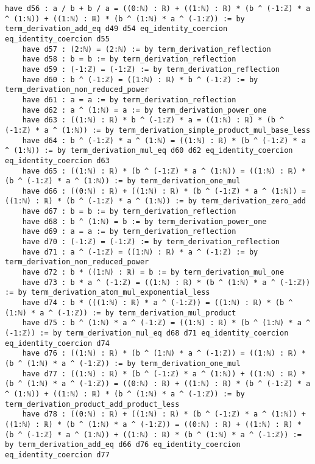 \documentclass{article}
\begin{document}
\begin{tcolorbox}[colback=white!10, width=\linewidth]
\begin{lstlisting}[language=Lean4]
    have d56 : a / b + b / a = ((0:ℕ) : ℝ) + ((1:ℕ) : ℝ) * (b ^ (-1:ℤ) * a ^ (1:ℕ)) + ((1:ℕ) : ℝ) * (b ^ (1:ℕ) * a ^ (-1:ℤ)) := by term_derivation_add_eq d49 d54 eq_identity_coercion eq_identity_coercion d55
    have d57 : (2:ℕ) = (2:ℕ) := by term_derivation_reflection
    have d58 : b = b := by term_derivation_reflection
    have d59 : (-1:ℤ) = (-1:ℤ) := by term_derivation_reflection
    have d60 : b ^ (-1:ℤ) = ((1:ℕ) : ℝ) * b ^ (-1:ℤ) := by term_derivation_non_reduced_power
    have d61 : a = a := by term_derivation_reflection
    have d62 : a ^ (1:ℕ) = a := by term_derivation_power_one
    have d63 : ((1:ℕ) : ℝ) * b ^ (-1:ℤ) * a = ((1:ℕ) : ℝ) * (b ^ (-1:ℤ) * a ^ (1:ℕ)) := by term_derivation_simple_product_mul_base_less
    have d64 : b ^ (-1:ℤ) * a ^ (1:ℕ) = ((1:ℕ) : ℝ) * (b ^ (-1:ℤ) * a ^ (1:ℕ)) := by term_derivation_mul_eq d60 d62 eq_identity_coercion eq_identity_coercion d63
    have d65 : ((1:ℕ) : ℝ) * (b ^ (-1:ℤ) * a ^ (1:ℕ)) = ((1:ℕ) : ℝ) * (b ^ (-1:ℤ) * a ^ (1:ℕ)) := by term_derivation_one_mul
    have d66 : ((0:ℕ) : ℝ) + ((1:ℕ) : ℝ) * (b ^ (-1:ℤ) * a ^ (1:ℕ)) = ((1:ℕ) : ℝ) * (b ^ (-1:ℤ) * a ^ (1:ℕ)) := by term_derivation_zero_add
    have d67 : b = b := by term_derivation_reflection
    have d68 : b ^ (1:ℕ) = b := by term_derivation_power_one
    have d69 : a = a := by term_derivation_reflection
    have d70 : (-1:ℤ) = (-1:ℤ) := by term_derivation_reflection
    have d71 : a ^ (-1:ℤ) = ((1:ℕ) : ℝ) * a ^ (-1:ℤ) := by term_derivation_non_reduced_power
    have d72 : b * ((1:ℕ) : ℝ) = b := by term_derivation_mul_one
    have d73 : b * a ^ (-1:ℤ) = ((1:ℕ) : ℝ) * (b ^ (1:ℕ) * a ^ (-1:ℤ)) := by term_derivation_atom_mul_exponential_less
    have d74 : b * (((1:ℕ) : ℝ) * a ^ (-1:ℤ)) = ((1:ℕ) : ℝ) * (b ^ (1:ℕ) * a ^ (-1:ℤ)) := by term_derivation_mul_product
    have d75 : b ^ (1:ℕ) * a ^ (-1:ℤ) = ((1:ℕ) : ℝ) * (b ^ (1:ℕ) * a ^ (-1:ℤ)) := by term_derivation_mul_eq d68 d71 eq_identity_coercion eq_identity_coercion d74
    have d76 : ((1:ℕ) : ℝ) * (b ^ (1:ℕ) * a ^ (-1:ℤ)) = ((1:ℕ) : ℝ) * (b ^ (1:ℕ) * a ^ (-1:ℤ)) := by term_derivation_one_mul
    have d77 : ((1:ℕ) : ℝ) * (b ^ (-1:ℤ) * a ^ (1:ℕ)) + ((1:ℕ) : ℝ) * (b ^ (1:ℕ) * a ^ (-1:ℤ)) = ((0:ℕ) : ℝ) + ((1:ℕ) : ℝ) * (b ^ (-1:ℤ) * a ^ (1:ℕ)) + ((1:ℕ) : ℝ) * (b ^ (1:ℕ) * a ^ (-1:ℤ)) := by term_derivation_product_add_product_less
    have d78 : ((0:ℕ) : ℝ) + ((1:ℕ) : ℝ) * (b ^ (-1:ℤ) * a ^ (1:ℕ)) + ((1:ℕ) : ℝ) * (b ^ (1:ℕ) * a ^ (-1:ℤ)) = ((0:ℕ) : ℝ) + ((1:ℕ) : ℝ) * (b ^ (-1:ℤ) * a ^ (1:ℕ)) + ((1:ℕ) : ℝ) * (b ^ (1:ℕ) * a ^ (-1:ℤ)) := by term_derivation_add_eq d66 d76 eq_identity_coercion eq_identity_coercion d77

\end{lstlisting}
\end{tcolorbox}
\end{document}
